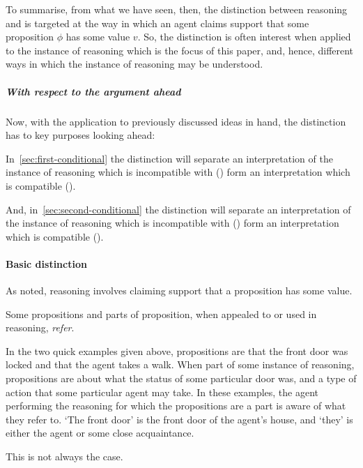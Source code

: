 \begin{note}
  To summarise, from what we have seen, then, the distinction between reasoning \ur{} and \nr{} is targeted at the way in which an agent claims support that some proposition \(\phi\) has some value \(v\).
  So, the distinction is often interest when applied to the instance of reasoning which is the focus of this paper, and, hence, different ways in which the instance of reasoning may be understood.
\end{note}

\subparagraph*{With respect to the argument ahead}

\begin{note}
  Now, with the application to previously discussed ideas in hand, the distinction has to key purposes looking ahead:

  In~\autoref{sec:first-conditional} the distinction will separate an interpretation of the instance of reasoning which is incompatible with \ESU{} (\ur{}) form an interpretation which is compatible (\nr{}).

  And, in~\autoref{sec:second-conditional} the distinction will separate an interpretation of the instance of reasoning which is incompatible with \nI{} (\nr{}) form an interpretation which is compatible (\ur{}).
\end{note}

\paragraph*{Basic distinction}

\begin{note}[Reasoning]
  As noted, reasoning involves claiming support that a proposition has some value.

  Some propositions and parts of proposition, when appealed to or used in reasoning, \emph{refer}.

  In the two quick examples given above, propositions are that the front door was locked and that the agent takes a walk.
  When part of some instance of reasoning, propositions are about what the status of some particular door was, and a type of action that some particular agent may take.
  In these examples, the agent performing the reasoning for which the propositions are a part is aware of what they refer to.
  `The front door' is the front door of the agent's house, and `they' is either the agent or some close acquaintance.

  This is not always the case.

\end{note}

